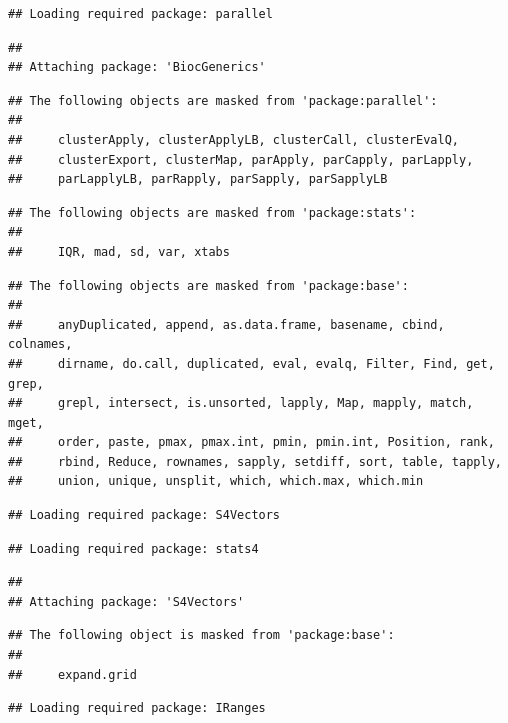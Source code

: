 \documentclass[
]{book}
\begin{document}
\begin{verbatim}
## Loading required package: parallel
\end{verbatim}

\begin{verbatim}
## 
## Attaching package: 'BiocGenerics'
\end{verbatim}

\begin{verbatim}
## The following objects are masked from 'package:parallel':
## 
##     clusterApply, clusterApplyLB, clusterCall, clusterEvalQ,
##     clusterExport, clusterMap, parApply, parCapply, parLapply,
##     parLapplyLB, parRapply, parSapply, parSapplyLB
\end{verbatim}

\begin{verbatim}
## The following objects are masked from 'package:stats':
## 
##     IQR, mad, sd, var, xtabs
\end{verbatim}

\begin{verbatim}
## The following objects are masked from 'package:base':
## 
##     anyDuplicated, append, as.data.frame, basename, cbind, colnames,
##     dirname, do.call, duplicated, eval, evalq, Filter, Find, get, grep,
##     grepl, intersect, is.unsorted, lapply, Map, mapply, match, mget,
##     order, paste, pmax, pmax.int, pmin, pmin.int, Position, rank,
##     rbind, Reduce, rownames, sapply, setdiff, sort, table, tapply,
##     union, unique, unsplit, which, which.max, which.min
\end{verbatim}

\begin{verbatim}
## Loading required package: S4Vectors
\end{verbatim}

\begin{verbatim}
## Loading required package: stats4
\end{verbatim}

\begin{verbatim}
## 
## Attaching package: 'S4Vectors'
\end{verbatim}

\begin{verbatim}
## The following object is masked from 'package:base':
## 
##     expand.grid
\end{verbatim}

\begin{verbatim}
## Loading required package: IRanges
\end{verbatim}
\end{document}
